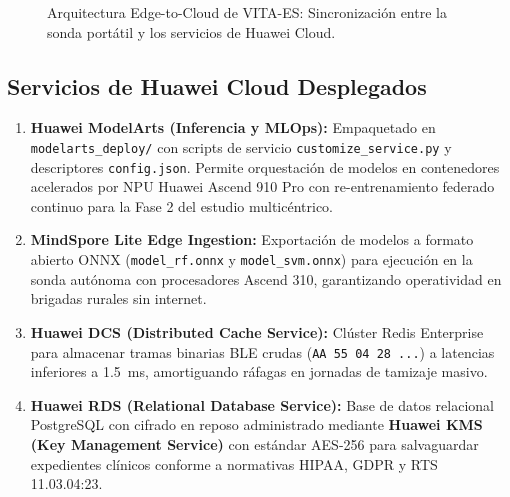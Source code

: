 \documentclass[11pt,a4paper]{article}
\begin{document}
\begin{figure}[H]
{
}
\caption{Arquitectura Edge-to-Cloud de VITA-ES: Sincronización entre la sonda portátil y los servicios de Huawei Cloud.}
\label{fig:huawei_arch}
\end{figure}

\subsection{Servicios de Huawei Cloud Desplegados}
\begin{enumerate}
    \item \textbf{Huawei ModelArts (Inferencia y MLOps):} Empaquetado en \texttt{modelarts\_deploy/} con scripts de servicio \texttt{customize\_service.py} y descriptores \texttt{config.json}. Permite orquestación de modelos en contenedores acelerados por NPU Huawei Ascend 910 Pro con re-entrenamiento federado continuo para la Fase 2 del estudio multicéntrico.
    \item \textbf{MindSpore Lite Edge Ingestion:} Exportación de modelos a formato abierto ONNX (\texttt{model\_rf.onnx} y \texttt{model\_svm.onnx}) para ejecución en la sonda autónoma con procesadores Ascend 310, garantizando operatividad en brigadas rurales sin internet.
    \item \textbf{Huawei DCS (Distributed Cache Service):} Clúster Redis Enterprise para almacenar tramas binarias BLE crudas (\texttt{AA 55 04 28 ...}) a latencias inferiores a 1.5~ms, amortiguando ráfagas en jornadas de tamizaje masivo.
    \item \textbf{Huawei RDS (Relational Database Service):} Base de datos relacional PostgreSQL con cifrado en reposo administrado mediante \textbf{Huawei KMS (Key Management Service)} con estándar AES-256 para salvaguardar expedientes clínicos conforme a normativas HIPAA, GDPR y RTS 11.03.04:23.
\end{enumerate}
\end{document}
